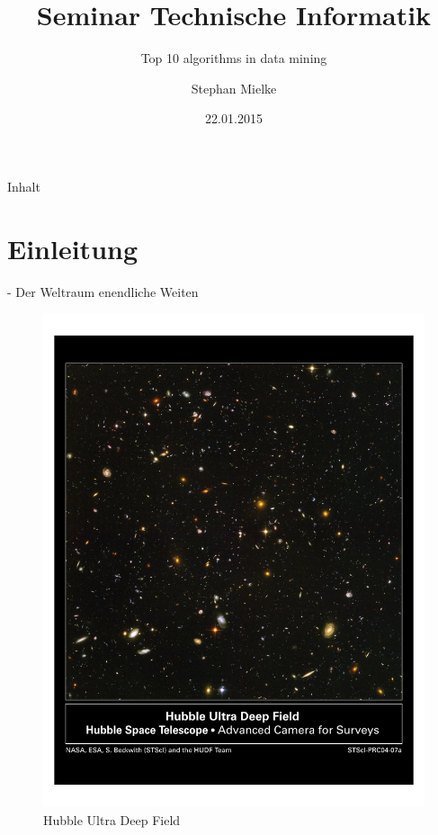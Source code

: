 \documentclass[fleqn,11pt,aspectratio=43]{beamer}
\title{Seminar Technische Informatik}
\subtitle{Top 10 algorithms in data mining}
\author{Stephan Mielke}
\date{22.01.2015}
\begin{document}
\begin{frame}[plain]
\titlepage
\end{frame}

\begin{frame}{Inhalt}
\tableofcontents
\end{frame}

\section*{Einleitung~}

\begin{frame}[plain]{\insertsectionhead - Der Weltraum enendliche Weiten}

\begin{figure}
\includegraphics[scale=0.6,trim={40 400 40 80},clip]{hs-2004-07-a-pdf}
\caption{Hubble Ultra Deep Field\cite{HUDF}}
\label{fig:hs-2004-07-a-pdf}
\end{figure}

\end{frame}
\end{document}

